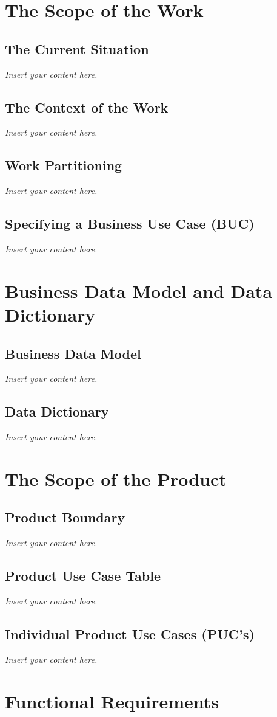 \documentclass[12pt]{article}
\newcommand{\lips}{\textit{Insert your content here.}}
\begin{document}
\section{The Scope of the Work}
\subsection{The Current Situation}
\lips
\subsection{The Context of the Work}
\lips
\subsection{Work Partitioning}
\lips
\subsection{Specifying a Business Use Case (BUC)}
\lips

\section{Business Data Model and Data Dictionary}
\subsection{Business Data Model}
\lips
\subsection{Data Dictionary}
\lips

\section{The Scope of the Product}
\subsection{Product Boundary}
\lips
\subsection{Product Use Case Table}
\lips
\subsection{Individual Product Use Cases (PUC's)}
\lips

\section{Functional Requirements}
\end{document}
